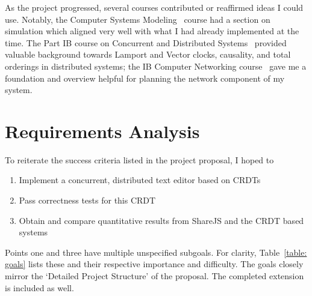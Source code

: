 \documentclass[12pt,a4paper,twoside,openright]{report}
\begin{document}
As the project progressed, several courses contributed or reaffirmed ideas I could use. Notably, the Computer Systems Modeling~\cite{compsysmodeling} course had a section on simulation which aligned very well with what I had already implemented at the time. The Part IB course on Concurrent and Distributed Systems~\cite{concdistsystems} provided valuable background towards Lamport and Vector clocks, causality, and total orderings in distributed systems; the IB Computer Networking course~\cite{computernetworking} gave me a foundation and overview helpful for planning the network component of my system.



\section{Requirements Analysis}
To reiterate the success criteria listed in the project proposal, I hoped to

\begin{enumerate}
\item Implement a concurrent, distributed text editor based on CRDTs 
\item Pass correctness tests for this CRDT
\item Obtain and compare quantitative results from ShareJS and the CRDT based systems
\end{enumerate}

Points one and three have multiple unspecified subgoals. For clarity, Table~\ref{table: goals} lists these and their respective importance and difficulty. The goals closely mirror the `Detailed Project Structure' of the proposal. The completed extension is included as well.
\end{document}

